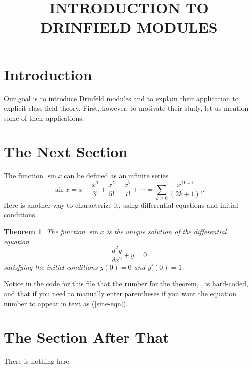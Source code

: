 \documentclass{scrartcl}
\title{INTRODUCTION TO DRINFIELD MODULES}
\theoremstyle{plain}
\newtheorem{theorem}{Theorem}[section]
\theoremstyle{definition}
\begin{document}
\maketitle

\section{Introduction}
Our goal is to introduce Drinfeld modules and to explain their application to explicit class
field theory. First, however, to motivate their study, let us mention some of their applications.

\section{The Next Section}\label{sec1}
The function $\sin x$ can be defined as an infinite series
\begin{equation}\label{sineseries}
\sin x = x - \frac{x^3}{3!} + \frac{x^5}{5!} - \frac{x^7}{7!} + \cdots = \sum_{k \geq 0} \frac{x^{2k+1}}{(2k+1)!}.
\end{equation}
Here is another way to characterize it, using differential equations and initial conditions.

\begin{theorem}\label{diffthm}
The function $\sin x$ is the unique solution of the differential equation
\begin{equation}\label{sine-eqn}
\frac{d^2y}{dx^2} + y = 0
\end{equation}
satisfying the initial conditions $y(0) = 0$ and $y'(0) = 1$.
\end{theorem}

Notice in the code for this file that the number for the theorem, , is hard-coded, and that 
if you need to manually enter parentheses if you want the equation number to appear in text as (\ref{sine-eqn}).


\section{The Section After That}\label{sec2}

There is nothing here.
\end{document}

